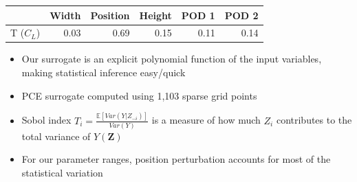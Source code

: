 \documentclass[9pt]{beamer}
\newcommand{\bv}[1]{\mathbf{#1}}
\begin{document}
\begin{frame}
\begin{center}
\begin{tabular}{lrrrrr}
            &  Width  &  Position  &  Height  &  POD 1  &  POD 2  \\
\hline
 T ($C_L$)  &   0.03  &      0.69  &    0.15  &   0.11  &   0.14  \\
\end{tabular}
\end{center}



\begin{itemize}
\item Our surrogate is an explicit polynomial function of the input
  variables, making statistical inference easy/quick
\item PCE surrogate computed using 1,103 sparse grid points
\item Sobol index $T_i = \frac{\mathbb{E}\left[ Var\left(
  Y|Z_{-i}\right)\right]}{Var\left( Y\right)}$ is a measure of how much
  $Z_i$ contributes to the total variance of $Y(\bv{Z})$
\item For our parameter ranges, position perturbation accounts for most of
  the statistical variation
\end{itemize}
\end{frame}
\end{document}
